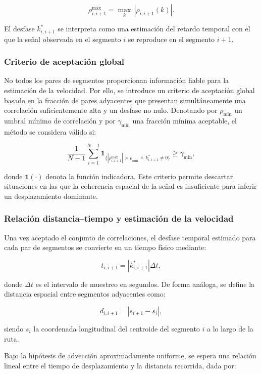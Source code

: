 \documentclass[
  spanish,
  us-letterpaper,
]{scrreprt}
\numberwithin{equation}{section}
\begin{document}
\[
\rho^{\max}_{i,i+1} = \max_k \, |\rho_{i,i+1}(k)|.
\]

El desfase \(k^*_{i,i+1}\) se interpreta como una estimación del retardo
temporal con el que la señal observada en el segmento \(i\) se reproduce
en el segmento \(i+1\).

\subsubsection{Criterio de aceptación
global}\label{criterio-de-aceptaciuxf3n-global}

No todos los pares de segmentos proporcionan información fiable para la
estimación de la velocidad. Por ello, se introduce un criterio de
aceptación global basado en la fracción de pares adyacentes que
presentan simultáneamente una correlación suficientemente alta y un
desfase no nulo. Denotando por \(\rho_{\min}\) un umbral mínimo de
correlación y por \(\gamma_{\min}\) una fracción mínima aceptable, el
método se considera válido si:

\[
\frac{1}{N-1} \sum_{i=1}^{N-1} \mathbf{1}_{\{|\rho^{\max}_{i,i+1}| > \rho_{\min} \, \wedge \, k^*_{i,i+1} \neq 0\}} \geq \gamma_{\min},
\]

donde \(\mathbf{1}(\cdot)\) denota la función indicadora. Este criterio
permite descartar situaciones en las que la coherencia espacial de la
señal es insuficiente para inferir un desplazamiento dominante.

\subsubsection{Relación distancia--tiempo y estimación de la
velocidad}\label{relaciuxf3n-distanciatiempo-y-estimaciuxf3n-de-la-velocidad}

Una vez aceptado el conjunto de correlaciones, el desfase temporal
estimado para cada par de segmentos se convierte en un tiempo físico
mediante:

\[
t_{i,i+1} = |k^*_{i,i+1}| \Delta t,
\]

donde \(\Delta t\) es el intervalo de muestreo en segundos. De forma
análoga, se define la distancia espacial entre segmentos adyacentes
como:

\[
d_{i,i+1} = |s_{i+1} - s_i|,
\]

siendo \(s_i\) la coordenada longitudinal del centroide del segmento
\(i\) a lo largo de la ruta.

Bajo la hipótesis de advección aproximadamente uniforme, se espera una
relación lineal entre el tiempo de desplazamiento y la distancia
recorrida, dada por:
\end{document}
